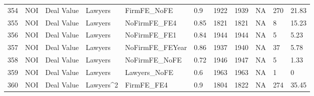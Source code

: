 \begin{table}[ht]
\begin{tabular}{rllllllllll}
  354 & NOI & Deal Value & Lawyers & FirmFE\_NoFE & 0.9 & 1922 & 1939 & NA & 270 & 21.83 \\ 
  355 & NOI & Deal Value & Lawyers & NoFirmFE\_FE4 & 0.85 & 1821 & 1821 & NA & 8 & 15.23 \\ 
  356 & NOI & Deal Value & Lawyers & NoFirmFE\_FE1 & 0.84 & 1944 & 1944 & NA & 5 & 5.23 \\ 
  357 & NOI & Deal Value & Lawyers & NoFirmFE\_FEYear & 0.86 & 1937 & 1940 & NA & 37 & 5.78 \\ 
  358 & NOI & Deal Value & Lawyers & NoFirmFE\_NoFE & 0.72 & 1946 & 1947 & NA & 5 & 1.33 \\ 
  359 & NOI & Deal Value & Lawyers & Lawyers\_NoFE & 0.6 & 1963 & 1963 & NA & 1 & 0 \\ 
  360 & NOI & Deal Value & Lawyers^2 & FirmFE\_FE4 & 0.9 & 1804 & 1822 & NA & 274 & 35.45 \\ 
   \hline
\end{tabular}
\end{table}
